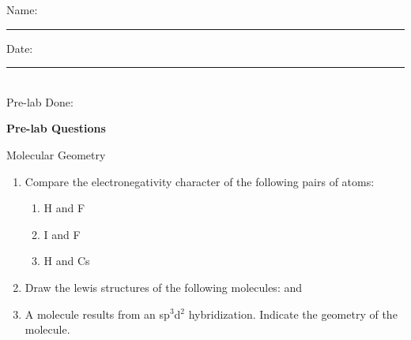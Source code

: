 \documentclass[cover.tex]{subfiles}
\begin{document}
\begin{refsection}
\sidebar{%
  \vspace{1em}
  \vspace{1cm}
  \vfill
  \par\vspace*{1em}
}
\restoregeometry
\clearpage \begin{multicols}{2}
\begin{tcolorbox}[enhanced jigsaw,breakable,size=title,
colback=mybrown!05,colframe=black,fonttitle=\bfseries,
title=STUDENT INFO,pad at break=1mm, break at=15cm/0pt ]
\vspace{0.2cm}
\noindent Name: \rule{5cm}{0.4pt}Date:\rule{1cm}{0.4pt}\\
Pre-lab Done: \quad
\end{tcolorbox}
\end{multicols}
\hfill
\vspace{0.2cm}
\begin{center}
{\large \bfseries 
Pre-lab Questions 
\par
\Huge
Molecular Geometry
\\[5pt] \par}
\vspace{0.2cm}
\end{center}
\par
\noindent
\uline{  \hfill \normalsize \hfill       }
\begin{enumerate}
\item  Compare the electronegativity character of the following pairs of atoms:
   \begin{multicols}{3}
\begin{enumerate}
\item H and F
\item I and F
\item H and Cs
\end{enumerate}
   \end{multicols}
\vspace{4cm}



\item  Draw the lewis structures of the following molecules:  and 
\vspace{4cm}




\item A molecule results from an sp$^3$d$^2$ hybridization. Indicate the geometry of the molecule.




\end{enumerate}
\end{refsection}
\end{document}
